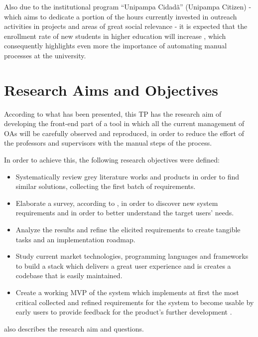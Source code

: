 Also due to the institutional program ``Unipampa Cidadã'' (Unipampa Citizen) - which aims to dedicate a portion of the hours currently invested in outreach activities in projects and areas of great social relevance - it is expected that the enrollment rate of new students in higher education will increase \cite{unipampacidada}, which consequently highlights even more the importance of automating manual processes at the university.

\section{Research Aims and Objectives}\label{sec:objectives}

According to what has been presented, this \ac{TP} has the research aim of developing the front-end part of a tool in which all the current management of \acp{OA} will be carefully observed and reproduced, in order to reduce the effort of the professors and supervisors with the manual steps of the process.

In order to achieve this, the following research objectives were defined:

\begin{itemize}
  \item Systematically review grey literature works and products in order to find similar solutions, collecting the first batch of requirements.
  \item Elaborate a survey, according to \textcite{kasunic2005designing}, in order to discover new system requirements and in order to better understand the target users' needs.
  \item Analyze the results and refine the elicited requirements to create tangible tasks and an implementation roadmap.
  \item Study current market technologies, programming languages and frameworks to build a stack which delivers a great user experience and is creates a codebase that is easily maintained.
  \item Create a working \ac{MVP} of the system which implements at first the most critical collected and refined requirements for the system to become usable by early users to provide feedback for the product's further development \cite{becker_2020}.
\end{itemize}

 also describes the research aim and questions.



